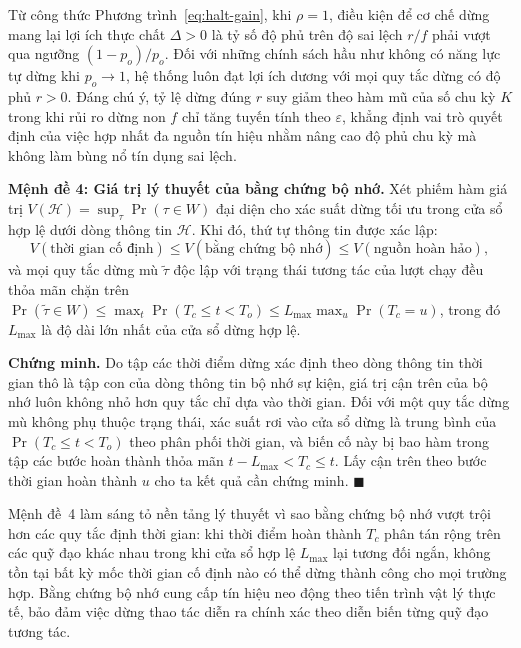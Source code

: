 Từ công thức Phương trình~\eqref{eq:halt-gain}, khi $\rho = 1$, điều kiện để cơ chế dừng mang lại lợi ích thực chất $\Delta > 0$ là tỷ số độ phủ trên độ sai lệch $r / f$ phải vượt qua ngưỡng $(1 - p_o) / p_o$. Đối với những chính sách hầu như không có năng lực tự dừng khi $p_o \to 1$, hệ thống luôn đạt lợi ích dương với mọi quy tắc dừng có độ phủ $r > 0$. Đáng chú ý, tỷ lệ dừng đúng $r$ suy giảm theo hàm mũ của số chu kỳ $K$ trong khi rủi ro dừng non $f$ chỉ tăng tuyến tính theo $\varepsilon$, khẳng định vai trò quyết định của việc hợp nhất đa nguồn tín hiệu nhằm nâng cao độ phủ chu kỳ mà không làm bùng nổ tín dụng sai lệch.

\textbf{Mệnh đề 4: Giá trị lý thuyết của bằng chứng bộ nhớ.} Xét phiếm hàm giá trị $V(\mathcal H) = \sup_\tau \Pr(\tau \in W)$ đại diện cho xác suất dừng tối ưu trong cửa sổ hợp lệ dưới dòng thông tin $\mathcal H$. Khi đó, thứ tự thông tin được xác lập:
\begin{equation}
V(\text{thời gian cố định}) \le V(\text{bằng chứng bộ nhớ}) \le V(\text{nguồn hoàn hảo}),
\label{eq:value-of-evidence}
\end{equation}
và mọi quy tắc dừng mù $\tilde\tau$ độc lập với trạng thái tương tác của lượt chạy đều thỏa mãn chặn trên $\Pr(\tilde\tau \in W) \le \max_t \Pr(T_c \le t < T_o) \le L_{\max} \max_u \Pr(T_c = u)$, trong đó $L_{\max}$ là độ dài lớn nhất của cửa sổ dừng hợp lệ.

\textbf{Chứng minh.} Do tập các thời điểm dừng xác định theo dòng thông tin thời gian thô là tập con của dòng thông tin bộ nhớ sự kiện, giá trị cận trên của bộ nhớ luôn không nhỏ hơn quy tắc chỉ dựa vào thời gian. Đối với một quy tắc dừng mù không phụ thuộc trạng thái, xác suất rơi vào cửa sổ dừng là trung bình của $\Pr(T_c \le t < T_o)$ theo phân phối thời gian, và biến cố này bị bao hàm trong tập các bước hoàn thành thỏa mãn $t - L_{\max} < T_c \le t$. Lấy cận trên theo bước thời gian hoàn thành $u$ cho ta kết quả cần chứng minh. $\blacksquare$

Mệnh đề~4 làm sáng tỏ nền tảng lý thuyết vì sao bằng chứng bộ nhớ vượt trội hơn các quy tắc định thời gian: khi thời điểm hoàn thành $T_c$ phân tán rộng trên các quỹ đạo khác nhau trong khi cửa sổ hợp lệ $L_{\max}$ lại tương đối ngắn, không tồn tại bất kỳ mốc thời gian cố định nào có thể dừng thành công cho mọi trường hợp. Bằng chứng bộ nhớ cung cấp tín hiệu neo động theo tiến trình vật lý thực tế, bảo đảm việc dừng thao tác diễn ra chính xác theo diễn biến từng quỹ đạo tương tác.
